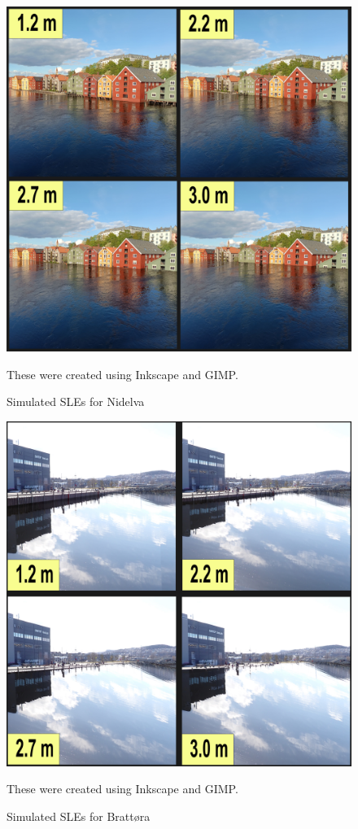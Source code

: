 \begin{figure}[H]
    \centering
    \includegraphics[width=16cm]{fig_sle/nidelva 2090 q.png}
    \caption{Simulated SLEs for Nidelva}
    {These were created using Inkscape and GIMP.}
    \label{fig:SLE-nidelva}
\end{figure}

\begin{figure}[H]
    \centering
    \includegraphics[width=16cm]{fig_sle/brattora 2090 q.png}
    \caption{Simulated SLEs for Brattøra}
    {These were created using Inkscape and GIMP. }
    \label{fig:SLE-brattora}
\end{figure}

